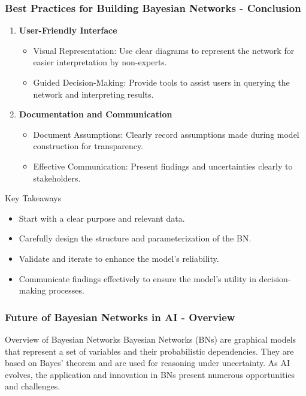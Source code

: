 \documentclass[aspectratio=169]{beamer}
\begin{document}
\begin{frame}[fragile]
    \frametitle{Best Practices for Building Bayesian Networks - Conclusion}
    \begin{enumerate}[start=7]
        \item \textbf{User-Friendly Interface}
        \begin{itemize}
            \item Visual Representation: Use clear diagrams to represent the network for easier interpretation by non-experts.
            \item Guided Decision-Making: Provide tools to assist users in querying the network and interpreting results.
        \end{itemize}
        
        \item \textbf{Documentation and Communication}
        \begin{itemize}
            \item Document Assumptions: Clearly record assumptions made during model construction for transparency.
            \item Effective Communication: Present findings and uncertainties clearly to stakeholders.
        \end{itemize}
    \end{enumerate}
    \begin{block}{Key Takeaways}
        \begin{itemize}
            \item Start with a clear purpose and relevant data.
            \item Carefully design the structure and parameterization of the BN.
            \item Validate and iterate to enhance the model’s reliability.
            \item Communicate findings effectively to ensure the model's utility in decision-making processes.
        \end{itemize}
    \end{block}
\end{frame}

\begin{frame}[fragile]
    \frametitle{Future of Bayesian Networks in AI - Overview}
    \begin{block}{Overview of Bayesian Networks}
        Bayesian Networks (BNs) are graphical models that represent a set of variables and their probabilistic dependencies. 
        They are based on Bayes' theorem and are used for reasoning under uncertainty. 
        As AI evolves, the application and innovation in BNs present numerous opportunities and challenges.
    \end{block}
\end{frame}
\end{document}
